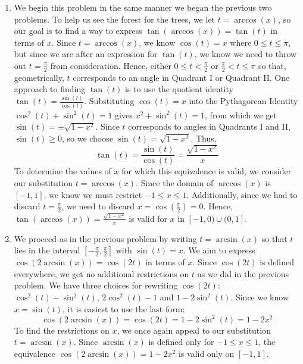 {\begin{enumerate}
\begin{enumerate}
\item We begin this problem in the same manner we began the previous two problems.  To help us see the forest for the trees, we let  $t = \arccos(x)$, so our goal is to find a way to express $\tan\left(\arccos\left(x \right)\right) = \tan(t)$ in terms of $x$.  Since $t = \arccos(x)$, we know $\cos(t) = x$ where $0 \leq t \leq \pi$, but since we are after an expression for $\tan(t)$, we know we need to throw out $t = \frac{\pi}{2}$ from consideration.  Hence, either $0 \leq t < \frac{\pi}{2}$ or $\frac{\pi}{2} < t \leq \pi$ so that, geometrically, $t$ corresponds to an angle in Quadrant I or Quadrant II.  One approach to finding $\tan(t)$ is to use the quotient identity $\tan(t) = \frac{\sin(t)}{\cos(t)}$.   Substituting $\cos(t) = x$ into the Pythagorean Identity $\cos^{2}(t) + \sin^{2}(t) = 1$ gives $x^2 + \sin^{2}(t) = 1$, from which we get $\sin(t) = \pm \sqrt{1-x^2}$.  Since $t$ corresponds to angles in Quadrants I and II,   $\sin(t) \geq 0$, so we choose $\sin(t) = \sqrt{1-x^2}$.  Thus, \[\tan(t) = \dfrac{\sin(t)}{\cos(t)} = \dfrac{\sqrt{1-x^2}}{x}\]  To determine the values of $x$ for which this equivalence is valid, we consider our substitution $t = \arccos(x)$.  Since the domain of $\arccos(x)$ is $[-1,1]$, we know we must restrict $-1 \leq x \leq 1$.  Additionally, since we had to discard $t = \frac{\pi}{2}$, we need to discard $x = \cos\left(\frac{\pi}{2}\right) = 0$. Hence, $\tan\left(\arccos\left(x \right)\right) =\frac{\sqrt{1-x^2}}{x}$  is valid for $x$ in $[-1,0)\cup(0,1]$.

\item We proceed as in the previous problem by writing $t = \arcsin(x)$ so that $t$ lies in the interval $\left[ -\frac{\pi}{2}, \frac{\pi}{2}\right]$ with $\sin(t) = x$.  We aim to express $\cos\left(2 \arcsin(x)\right) = \cos(2t)$ in terms of $x$.  Since $\cos(2t)$ is defined everywhere, we get no additional restrictions on $t$ as we did in the previous problem.  We have three choices for rewriting $\cos(2t)$:  $\cos^{2}(t) - \sin^{2}(t)$, $2\cos^{2}(t) - 1$ and $1 - 2\sin^{2}(t)$.  Since we know $x = \sin(t)$, it is easiest to use the last form: \[\cos\left(2 \arcsin(x)\right) = \cos(2t)  = 1 - 2\sin^{2}(t) = 1 - 2x^2\]  To find the restrictions on $x$, we once again appeal to our substitution $t = \arcsin(x)$.  Since $\arcsin(x)$ is defined only for $-1 \leq x \leq 1$, the equivalence $\cos\left(2 \arcsin(x)\right) = 1-2x^2$ is valid only on $[-1,1]$. 

\end{enumerate}

\end{enumerate}
}

